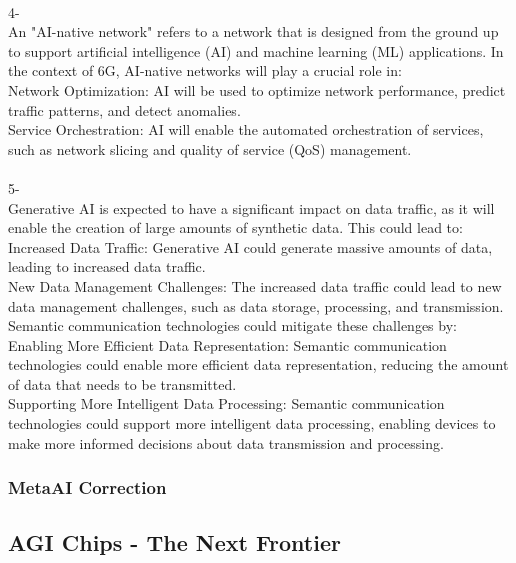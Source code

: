 \begin{tcolorbox}[breakable]
\\
4-\\
An "AI-native network" refers to a network that is designed from the ground up to support artificial intelligence (AI) and machine learning (ML) applications. In the context of 6G, AI-native networks will play a crucial role in:\\
Network Optimization: AI will be used to optimize network performance, predict traffic patterns, and detect anomalies.\\
Service Orchestration: AI will enable the automated orchestration of services, such as network slicing and quality of service (QoS) management.\\
\\
5-\\
Generative AI is expected to have a significant impact on data traffic, as it will enable the creation of large amounts of synthetic data. This could lead to:\\
Increased Data Traffic: Generative AI could generate massive amounts of data, leading to increased data traffic.\\
New Data Management Challenges: The increased data traffic could lead to new data management challenges, such as data storage, processing, and transmission.\\
Semantic communication technologies could mitigate these challenges by:\\
Enabling More Efficient Data Representation: Semantic communication technologies could enable more efficient data representation, reducing the amount of data that needs to be transmitted.\\
Supporting More Intelligent Data Processing: Semantic communication technologies could support more intelligent data processing, enabling devices to make more informed decisions about data transmission and processing.\\
\end{tcolorbox}
\subsubsection{MetaAI Correction}
\begin{tcolorbox}[breakable]
    
\end{tcolorbox}

\subsection{AGI Chips - The Next Frontier}
